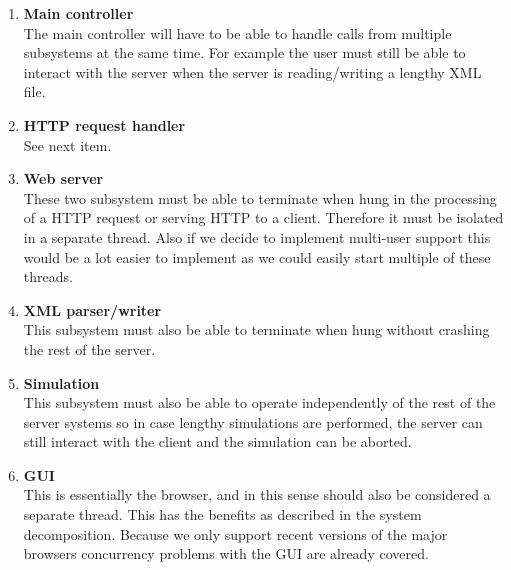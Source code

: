 \begin{enumerate}
\item \textbf{Main controller} \\
The main controller will have to be able to handle calls from multiple subsystems at the same time. For example the user must still be able to interact with the server when the server is reading/writing a lengthy XML file.\item \textbf{HTTP request handler} \\
See next item.
\item \textbf{Web server} \\
These two subsystem must be able to terminate when hung in the processing of a HTTP request or serving HTTP to a client. Therefore it must be isolated in a separate thread. Also if we decide to implement multi-user support this would be a lot easier to implement as we could easily start multiple of these threads. 
\item \textbf{XML parser/writer} \\
This subsystem must also be able to terminate when hung without crashing the rest of the server.
\item \textbf{Simulation} \\
This subsystem must also be able to operate independently of the rest of the server systems so in case lengthy simulations are performed, the server can still interact with the client and the simulation can be aborted.
\item \textbf{GUI} \\
This is essentially the browser, and in this sense should also be considered a separate thread. This has the benefits as described in the system decomposition. Because we only support recent versions of the major browsers concurrency problems with the GUI are already covered.\end{enumerate}